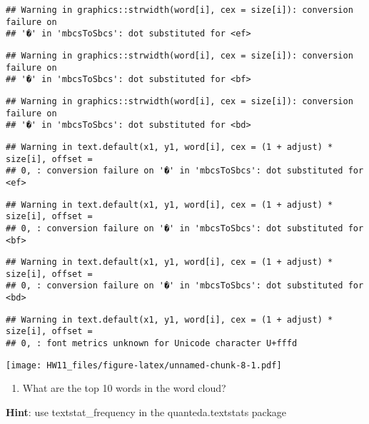 \documentclass[
]{article}
\providecommand{\tightlist}{%
  \setlength{\itemsep}{0pt}\setlength{\parskip}{0pt}}
\begin{document}
\begin{verbatim}
## Warning in graphics::strwidth(word[i], cex = size[i]): conversion failure on
## '�' in 'mbcsToSbcs': dot substituted for <ef>
\end{verbatim}

\begin{verbatim}
## Warning in graphics::strwidth(word[i], cex = size[i]): conversion failure on
## '�' in 'mbcsToSbcs': dot substituted for <bf>
\end{verbatim}

\begin{verbatim}
## Warning in graphics::strwidth(word[i], cex = size[i]): conversion failure on
## '�' in 'mbcsToSbcs': dot substituted for <bd>
\end{verbatim}

\begin{verbatim}
## Warning in text.default(x1, y1, word[i], cex = (1 + adjust) * size[i], offset =
## 0, : conversion failure on '�' in 'mbcsToSbcs': dot substituted for <ef>
\end{verbatim}

\begin{verbatim}
## Warning in text.default(x1, y1, word[i], cex = (1 + adjust) * size[i], offset =
## 0, : conversion failure on '�' in 'mbcsToSbcs': dot substituted for <bf>
\end{verbatim}

\begin{verbatim}
## Warning in text.default(x1, y1, word[i], cex = (1 + adjust) * size[i], offset =
## 0, : conversion failure on '�' in 'mbcsToSbcs': dot substituted for <bd>
\end{verbatim}

\begin{verbatim}
## Warning in text.default(x1, y1, word[i], cex = (1 + adjust) * size[i], offset =
## 0, : font metrics unknown for Unicode character U+fffd
\end{verbatim}

\texttt{[image: HW11\_files/figure-latex/unnamed-chunk-8-1.pdf]}

\begin{enumerate}
\def\labelenumi{\Alph{enumi}.}
\setcounter{enumi}{6}
\tightlist
\item
  What are the top 10 words in the word cloud?
\end{enumerate}

\textbf{Hint}: use textstat\_frequency in the quanteda.textstats package
\end{document}
